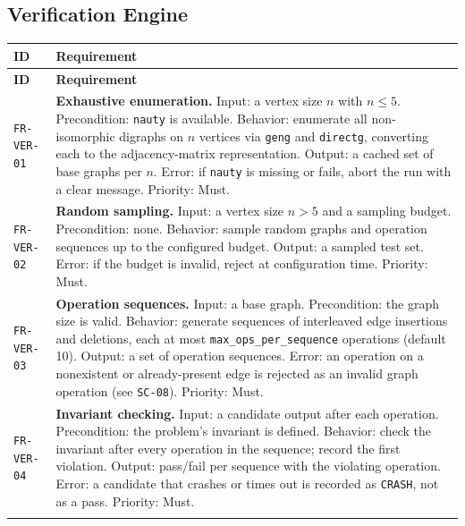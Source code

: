 \documentclass[12pt,a4paper]{article}
\begin{document}
\subsection{Verification Engine}

\begin{longtable}{@{}p{2.2cm}p{10.6cm}@{}}
\toprule
\textbf{ID} & \textbf{Requirement} \\
\midrule
\endfirsthead
\toprule
\textbf{ID} & \textbf{Requirement} \\
\midrule
\endhead
\bottomrule
\endfoot

\texttt{FR-VER-01} & \textbf{Exhaustive enumeration.} Input: a vertex size $n$ with $n \le 5$. Precondition: \texttt{nauty} is available. Behavior: enumerate all non-isomorphic digraphs on $n$ vertices via \texttt{geng} and \texttt{directg}, converting each to the adjacency-matrix representation. Output: a cached set of base graphs per $n$. Error: if \texttt{nauty} is missing or fails, abort the run with a clear message. Priority: Must. \\
\addlinespace[2pt]

\texttt{FR-VER-02} & \textbf{Random sampling.} Input: a vertex size $n > 5$ and a sampling budget. Precondition: none. Behavior: sample random graphs and operation sequences up to the configured budget. Output: a sampled test set. Error: if the budget is invalid, reject at configuration time. Priority: Must. \\
\addlinespace[2pt]

\texttt{FR-VER-03} & \textbf{Operation sequences.} Input: a base graph. Precondition: the graph size is valid. Behavior: generate sequences of interleaved edge insertions and deletions, each at most \texttt{max\_ops\_per\_sequence} operations (default 10). Output: a set of operation sequences. Error: an operation on a nonexistent or already-present edge is rejected as an invalid graph operation (see \texttt{SC-08}). Priority: Must. \\
\addlinespace[2pt]

\texttt{FR-VER-04} & \textbf{Invariant checking.} Input: a candidate output after each operation. Precondition: the problem's invariant is defined. Behavior: check the invariant after every operation in the sequence; record the first violation. Output: pass/fail per sequence with the violating operation. Error: a candidate that crashes or times out is recorded as \texttt{CRASH}, not as a pass. Priority: Must. \\
\addlinespace[2pt]


\end{longtable}
\end{document}
